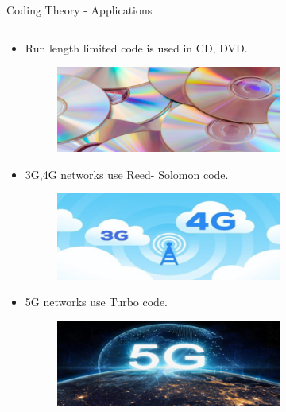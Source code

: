 \begin{frame}{Coding Theory - Applications}
    \begin{columns}
        \begin{column}{0.5\textwidth}
            \begin{itemize}
                \vfill \item Run length limited code is used in CD, DVD.
                \begin{figure}
                    \centering
                    \includegraphics[width=0.7\textwidth]{Images/Introduction/CDDVD.png}
                \end{figure}
                \hfill
                \vfill \item 3G,4G networks use Reed- Solomon code.
                \begin{figure}
                    \centering
                    \includegraphics[width=0.7\textwidth]{Images/Introduction/3G4G.png}
                \end{figure}
                \vfill \item 5G networks use Turbo code.
                \begin{figure}
                    \centering
                    \includegraphics[width=0.7\textwidth]{Images/Introduction/5G.png}
                \end{figure}
            \end{itemize}
        \end{column}
        

\end{columns}
\end{frame}
